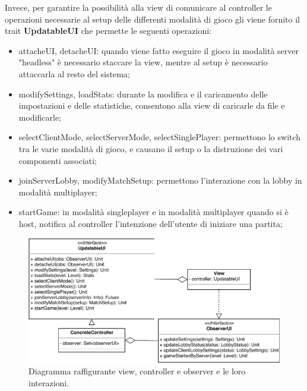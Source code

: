 Invece, per garantire la possibilità alla view di comunicare al controller le operazioni necessarie al setup delle differenti modalità di gioco gli viene fornito il trait \textbf{UpdatableUI} che permette le seguenti operazioni:
\begin{itemize}
    \item attacheUI, detacheUI: quando viene fatto eseguire il gioco in modalità server "headless" è necessario staccare la view, mentre al setup è necessario attaccarla al resto del sistema;
    \item modifySettings, loadStats: durante la modifica e il caricamento delle impostazioni e delle statistiche, consentono alla view di caricarle da file e modificarle;
    \item selectClientMode, selectServerMode, selectSinglePlayer: permettono lo switch tra le varie modalità di gioco, e causano il setup o la distruzione dei vari componenti associati;
    \item joinServerLobby, modifyMatchSetup: permettono l'interazione con la lobby in modalità multiplayer;
    \item startGame: in modalità singleplayer e in modalità multiplayer quando si è host, notifica al controller l'intenzione dell'utente di iniziare una partita;
\end{itemize}




\begin{figure}[H]
	\centering
	\includegraphics[width=\columnwidth]{drawio/view-controller-observer/view-controller-observer.pdf}
	\caption{Diagramma raffigurante view, controller e observer e le loro interazioni.}
	\label{fig:view-controller-observer}
\end{figure}